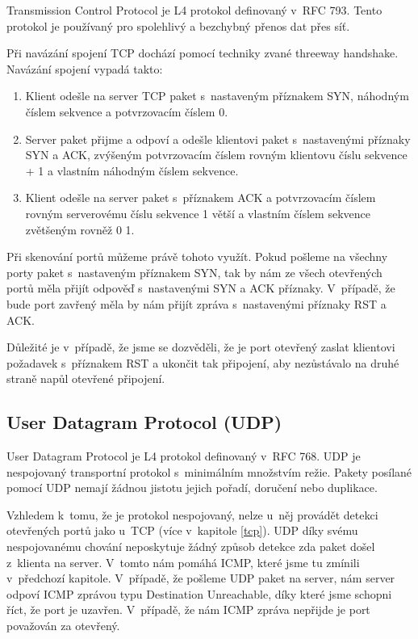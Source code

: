 \documentclass[../projekt.tex]{subfiles}
\begin{document}
Transmission Control Protocol je L4 protokol definovaný v~RFC 793\cite{RFC0793}. Tento protokol je používaný pro spolehlivý a bezchybný přenos dat přes síť.

Při navázání spojení TCP dochází pomocí techniky zvané threeway handshake. Navázání spojení vypadá takto:
\begin{enumerate}
    \item Klient odešle na server TCP paket s~nastaveným příznakem SYN, náhodným číslem sekvence a potvrzovacím číslem 0.
    \item Server paket přijme a odpoví a odešle klientovi paket s~nastavenými příznaky SYN a ACK, zvýšeným potvrzovacím číslem rovným klientovu číslu sekvence + 1 a vlastním náhodným číslem sekvence.
    \item Klient odešle na server paket s~příznakem ACK a potvrzovacím číslem rovným serverovému číslu sekvence 1 větší a vlastním číslem sekvence zvětšeným rovněž 0 1.
\end{enumerate} 

Při skenování portů můžeme právě tohoto využít. Pokud pošleme na všechny porty paket s~nastaveným příznakem SYN, tak by nám ze všech otevřených portů měla přijít odpověď s~nastavenými SYN a ACK příznaky. V~případě, že bude port zavřený měla by nám přijít zpráva s~nastavenými příznaky RST a ACK. 

Důležité je v~případě, že jsme se dozvěděli, že je port otevřený zaslat klientovi požadavek s~příznakem RST a ukončit tak připojení, aby nezůstávalo na druhé straně napůl otevřené připojení.

\subsection{User Datagram Protocol (UDP)} \label{udp}

User Datagram Protocol je L4 protokol definovaný v~RFC 768\cite{RFC0768}. UDP je nespojovaný transportní protokol s~minimálním množstvím režie. Pakety posílané pomocí UDP nemají žádnou jistotu jejich pořadí, doručení nebo duplikace. 

Vzhledem k~tomu, že je protokol nespojovaný, nelze u~něj provádět detekci otevřených portů jako u~TCP (více v~kapitole \ref{tcp}). UDP díky svému nespojovanému chování neposkytuje žádný způsob detekce zda paket došel z~klienta na server. V~tomto nám pomáhá ICMP, které jsme tu zmínili v~předchozí kapitole. V~případě, že pošleme UDP paket na server, nám server odpoví ICMP zprávou typu Destination Unreachable, díky které jsme schopni říct, že port je uzavřen. V~případě, že nám ICMP zpráva nepřijde je port považován za otevřený.
\end{document}
